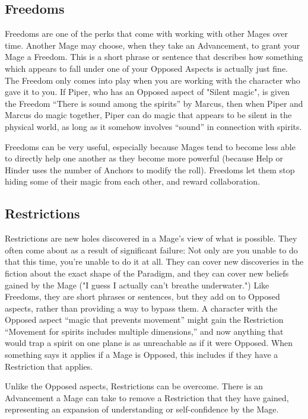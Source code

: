\documentclass[
  oneside,
  statementpaper,
  9pt]{memoir}
\begin{document}
\hypertarget{freedoms}{%
\subsection{Freedoms}\label{freedoms}}

\begin{Player}

Freedoms are one of the perks that come with working with other Mages over time. Another Mage may choose, when they take an Advancement, to grant your Mage a Freedom. This is a short phrase or sentence that describes how something which appears to fall under one of your Opposed Aspects is actually just fine. The Freedom only comes into play when you are working with the character who gave it to you. If Piper, who has an Opposed aspect of "Silent magic", is given the Freedom “There is sound among the spirits” by Marcus, then when Piper and Marcus do magic together, Piper can do magic that appears to be silent in the physical world, as long as it somehow involves “sound” in connection with spirits.

Freedoms can be very useful, especially because Mages tend to become less able to directly help one another as they become more powerful (because Help or Hinder uses the number of Anchors to modify the roll). Freedoms let them stop hiding some of their magic from each other, and reward collaboration.

\end{Player}

\hypertarget{restrictions}{%
\subsection{Restrictions}\label{restrictions}}

\begin{Player}

Restrictions are new holes discovered in a Mage’s view of what is possible. They often come about as a result of significant failure: Not only are you unable to do that this time, you’re unable to do it at all. They can cover new discoveries in the fiction about the exact shape of the Paradigm, and they can cover new beliefs gained by the Mage ("I guess I actually can’t breathe underwater.") Like Freedoms, they are short phrases or sentences, but they add on to Opposed aspects, rather than providing a way to bypass them. A character with the Opposed aspect “magic that prevents movement” might gain the Restriction “Movement for spirits includes multiple dimensions,” and now anything that would trap a spirit on one plane is as unreachable as if it were Opposed. When something says it applies if a Mage is Opposed, this includes if they have a Restriction that applies.

Unlike the Opposed aspects, Restrictions can be overcome. There is an Advancement a Mage can take to remove a Restriction that they have gained, representing an expansion of understanding or self-confidence by the Mage.

\end{Player}
\end{document}
